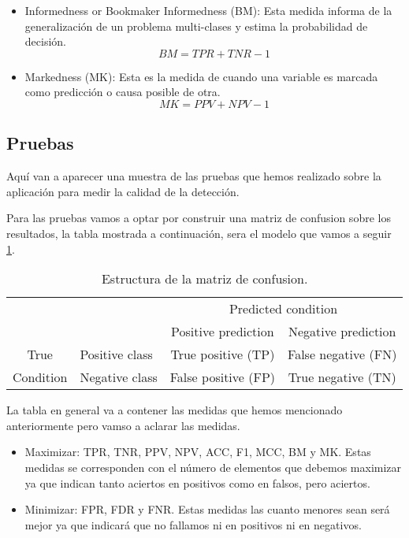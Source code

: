 \begin{itemize}
\item Informedness or Bookmaker Informedness (BM):
Esta medida informa de la generalización de un problema multi-clases y estima la probabilidad de decisión.
 \[\mathit{BM}=\mathit{TPR}+\mathit{TNR}-1\]

\item Markedness (MK):
Esta es la medida de cuando una variable es marcada como predicción o causa posible de otra.
 \[\mathit{MK}=\mathit{PPV}+\mathit{NPV}-1\]


\end{itemize}



\subsection{Pruebas}
Aquí van a aparecer una muestra de las pruebas que hemos realizado sobre la aplicación para medir la calidad de la detección.


Para las pruebas vamos a optar por construir una matriz de confusion sobre los resultados, la tabla mostrada a continuación, sera el modelo que vamos a seguir \ref{tab:ConfMatrix}.

\begin{table}
  \begin{center}
    \begin{tabular}{c l c c}
                 &                & \multicolumn{2}{c}{\cellcolor{brown!25}Predicted condition}   \\
                 &                & \cellcolor{brown!15}Positive prediction & \cellcolor{brown!45}Negative prediction \\
       \cellcolor{blue!15}True      & \cellcolor{blue!10}Positive class & \cellcolor{green!25}True positive (TP)  & \cellcolor{red!25}False negative (FN) \\
       \cellcolor{blue!15}Condition & \cellcolor{blue!30}Negative class & \cellcolor{red!25}False positive (FP) & \cellcolor{green!25}True negative (TN)  \\
    \end{tabular}
  \end{center}
  \caption{Estructura de la matriz de confusion.}
  \label{tab:ConfMatrix}
\end{table}


La tabla en general va a contener las medidas que hemos mencionado anteriormente pero vamso a aclarar las medidas.
\begin{itemize}
\item Maximizar: TPR, TNR, PPV, NPV, ACC, F1, MCC, BM y MK.
Estas medidas se corresponden con el número de elementos que debemos maximizar ya que indican tanto aciertos en positivos como en falsos, pero aciertos.
\item Minimizar: FPR, FDR y FNR.
Estas medidas las cuanto menores sean será mejor ya que indicará que no fallamos ni en positivos ni en negativos.
\end{itemize}

